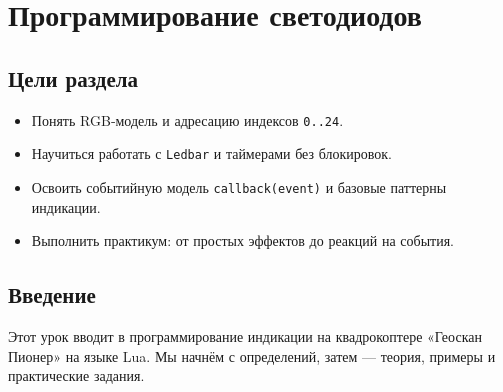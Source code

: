 \section{Программирование светодиодов}
\subsection*{Цели раздела}
\begin{itemize}
  \item Понять RGB‑модель и адресацию индексов \texttt{0..24}.
  \item Научиться работать с \texttt{Ledbar} и таймерами без блокировок.
  \item Освоить событийную модель \texttt{callback(event)} и базовые паттерны индикации.
  \item Выполнить практикум: от простых эффектов до реакций на события.
\end{itemize}
\subsection{Введение}
Этот урок вводит в программирование индикации на квадрокоптере «Геоскан Пионер» на языке Lua. Мы начнём с определений, затем — теория, примеры и практические задания.

